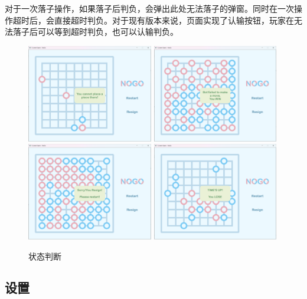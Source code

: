 \documentclass{noithesis}
\begin{document}
	对于一次落子操作，如果落子后判负，会弹出此处无法落子的弹窗。同时在一次操作超时后，会直接超时判负。对于现有版本来说，页面实现了认输按钮，玩家在无法落子后可以等到超时判负，也可以认输判负。
	
	\begin{figure}[htbp]
		\centering
		\includegraphics[width=5.5cm]{img/tip.png}
		\includegraphics[width=5.5cm]{img/win.png}
		\includegraphics[width=5.5cm]{img/resign.png}
		\includegraphics[width=5.5cm]{img/TLE.png}
		\caption{状态判断}
	\end{figure}
	
	\subsection{设置}
	
\end{document}
